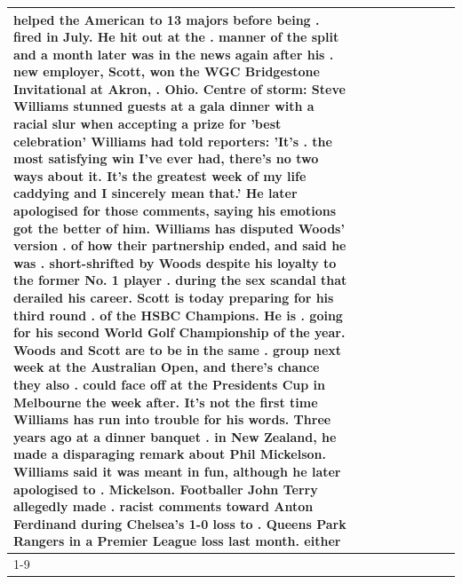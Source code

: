 \begin{table}[H]
\begin{tabular}{lllrlllll}
helped the American to 13 majors before being . fired in July. He hit out at the . manner of the split and a month later was in the news again after his . new employer, Scott, won the WGC Bridgestone Invitational at Akron, . Ohio. Centre of storm: Steve Williams stunned guests at a gala dinner with a racial slur when accepting a prize for 'best celebration' Williams had told reporters: 'It's . the most satisfying win I've ever had, there's no two ways about it. It's the greatest week of my life caddying and I sincerely mean that.' He later apologised for those comments, saying his emotions got the better of him. Williams has disputed Woods' version . of how their partnership ended, and said he was . short-shrifted by Woods despite his loyalty to the former No. 1 player . during the sex scandal that derailed his career. Scott is today preparing for his third round . of the HSBC Champions. He is . going for his second World Golf Championship of the year. Woods and Scott are to be in the same . group next week at the Australian Open, and there's chance they also . could face off at the Presidents Cup in Melbourne the week after. It's not the first time Williams has run into trouble for his words. Three years ago at a dinner banquet . in New Zealand, he made a disparaging remark about Phil Mickelson. Williams said it was meant in fun, although he later apologised to . Mickelson. Footballer John Terry allegedly made . racist comments toward Anton Ferdinand during Chelsea's 1-0 loss to . Queens Park Rangers in a Premier League loss last month. either \\
\cline{1-9}
\bottomrule
\end{tabular}
\end{table}
